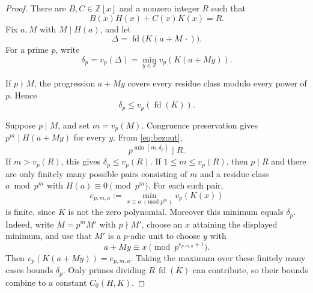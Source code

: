 \documentclass[10pt,a4paper]{amsart}
\newcommand{\Q}{\mathbb Q}
\newcommand{\Z}{\mathbb Z}
\newcommand{\fd}{\operatorname{fd}}
\begin{document}

\begin{proof}
There are \(B,C\in\Z[x]\) and a nonzero integer \(R\) such that
\begin{equation}\label{eq:bezout}
  B(x)H(x)+C(x)K(x)=R.
\end{equation}
Fix \(a,M\) with \(M\mid H(a)\), and let
\[
  \Delta=\fd\bigl(K(a+M\,\cdot)\bigr).
\]
For a prime \(p\), write
\[
  \delta_p=v_p(\Delta)
  =\min_{y\in\Z}v_p(K(a+My)).
\]

If \(p\nmid M\), the progression \(a+My\) covers every residue class
modulo every power of \(p\).  Hence
\[
  \delta_p\le v_p(\fd(K)).
\]

Suppose \(p\mid M\), and set \(m=v_p(M)\).  Congruence preservation gives
\(p^m\mid H(a+My)\) for every \(y\).  From \eqref{eq:bezout},
\[
  p^{\min(m,\delta_p)}\mid R.
\]
If \(m>v_p(R)\), this gives \(\delta_p\le v_p(R)\).  If
\(1\le m\le v_p(R)\), then \(p\mid R\) and there are only finitely many
possible pairs consisting of \(m\) and a residue class
\(a\bmod p^m\) with \(H(a)\equiv0\pmod {p^m}\).  For each such pair,
\[
  e_{p,m,a}:=\min_{x\equiv a\;(\mathrm{mod}\;p^m)}v_p(K(x))
\]
is finite, since \(K\) is not the zero polynomial.  Moreover this minimum
equals \(\delta_p\).  Indeed, write \(M=p^mM'\) with \(p\nmid M'\), choose
an \(x\) attaining the displayed minimum, and use that \(M'\) is a
\(p\)-adic unit to choose \(y\) with
\[
  a+My\equiv x\pmod {p^{e_{p,m,a}+1}}.
\]
Then \(v_p(K(a+My))=e_{p,m,a}\).  Taking the maximum over these finitely
many cases bounds \(\delta_p\).  Only primes dividing
\(R\,\fd(K)\) can contribute, so their bounds combine to a constant
\(C_0(H,K)\).
\end{proof}
\end{document}
